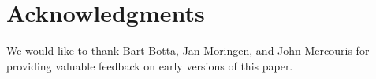 \section{Acknowledgments} 

We would like to thank Bart Botta, Jan Moringen, and John Mercouris
for providing valuable feedback on early versions of this paper.
